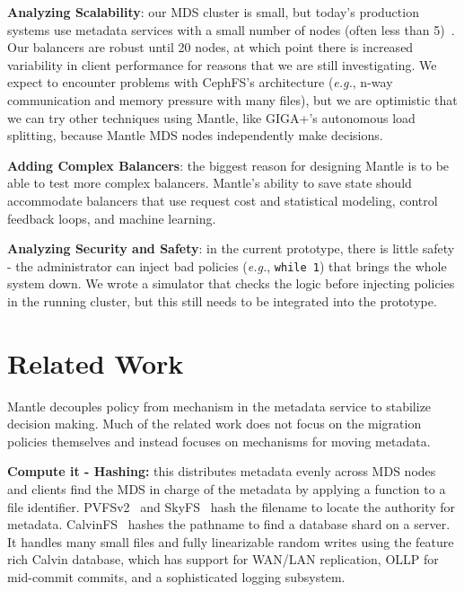 \textbf{Analyzing Scalability}: our MDS cluster is small, but today's production systems use metadata services with a small number of nodes (often less than 5)~\cite{website:ceph-cephfs-product-release}. Our balancers are robust until 20 nodes, at which point there is increased variability in client performance for reasons that we are still investigating. We expect to encounter problems with CephFS's architecture ({\it e.g.}, n-way communication and memory pressure with many files), but we are optimistic that we can try other techniques using Mantle, like GIGA+'s autonomous load splitting, because Mantle MDS nodes independently make decisions. 


\textbf{Adding Complex Balancers}: the biggest reason for designing Mantle is to be able to test more complex balancers. Mantle's ability to save state should accommodate balancers that use request cost and statistical modeling, control feedback loops, and machine learning.

\textbf{Analyzing Security and Safety}: in the current prototype, there is little safety - the administrator can inject bad policies ({\it e.g.}, \texttt{while 1}) that brings the whole system down. We wrote a simulator that checks the logic before injecting policies in the running cluster, but this still needs to be integrated into the prototype.


\section{Related Work}									%
\label{related-work}									%
Mantle decouples policy from mechanism in the metadata service to stabilize decision making. Much of the related work does not focus on the migration policies themselves and instead focuses on mechanisms for moving metadata. 

\textbf{Compute it - Hashing:} this distributes metadata evenly across MDS nodes and clients find the MDS in charge of the metadata by applying a function to a file identifier. PVFSv2~\cite{hildebrand:msst2005-pnfs} and SkyFS~\cite{xing:sc2009-skyfs} hash the filename to locate the authority for metadata. CalvinFS~\cite{thomson:fast2015-calvinfs} hashes the pathname to find a database shard on a server. It handles many small files and fully linearizable random writes using the feature rich Calvin database, which has support for WAN/LAN replication, OLLP for mid-commit commits, and a sophisticated logging subsystem. 

